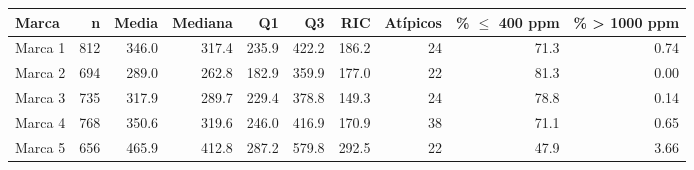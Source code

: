 \begin{tabular}{lrrrrrrrrr}
\toprule
\textbf{Marca} & \textbf{n} & \textbf{Media} & \textbf{Mediana} & \textbf{Q1} & \textbf{Q3} & \textbf{RIC} & \textbf{Atípicos} & \textbf{\% $\le$ 400 ppm} & \textbf{\% > 1000 ppm} \\ \midrule
Marca 1 & 812 & 346.0 & 317.4 & 235.9 & 422.2 & 186.2 & 24 & 71.3 & 0.74 \\
Marca 2 & 694 & 289.0 & 262.8 & 182.9 & 359.9 & 177.0 & 22 & 81.3 & 0.00 \\
Marca 3 & 735 & 317.9 & 289.7 & 229.4 & 378.8 & 149.3 & 24 & 78.8 & 0.14 \\
Marca 4 & 768 & 350.6 & 319.6 & 246.0 & 416.9 & 170.9 & 38 & 71.1 & 0.65 \\
Marca 5 & 656 & 465.9 & 412.8 & 287.2 & 579.8 & 292.5 & 22 & 47.9 & 3.66 \\
\bottomrule
\end{tabular}